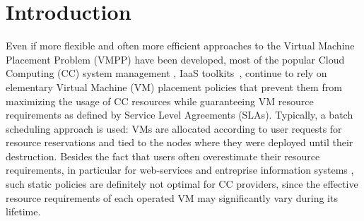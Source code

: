 \section{Introduction}
\label{sec:intro}


Even if more flexible and often more efficient approaches to the
Virtual Machine Placement Problem (VMPP) have been developed,
most of the popular Cloud Computing (CC) system management
\cite{cloudstack, opennebula, openstack}, \aka IaaS
toolkits~\cite{moreno:2012}, continue to rely on elementary Virtual
Machine (VM) placement policies that prevent them from maximizing the
usage of CC resources while guaranteeing VM resource requirements as
defined by Service Level Agreements (SLAs).
Typically, a batch scheduling approach is used: VMs are allocated
according to user requests for resource reservations and tied to
the nodes where they were deployed until their destruction. Besides
the fact that users often overestimate their resource requirements, in
particular for web-services and entreprise information systems
\cite{birke:nom2014, shen:ccgrid2015},
such static policies are definitely not optimal for CC providers,
since the effective resource requirements of each operated VM may
significantly vary during its lifetime.

